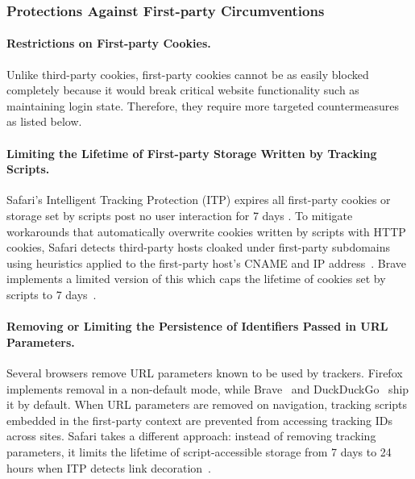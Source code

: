 \vspace{-4mm}
\subsubsection{Protections Against First-party Circumventions}

\paragraph{Restrictions on First-party Cookies.}
Unlike third-party cookies, first-party cookies cannot be as easily blocked completely because it would break critical website functionality such as maintaining login state. 
%
Therefore, they require more targeted countermeasures as listed below. 



\vspace{-1mm}
\paragraph{Limiting the Lifetime of First-party Storage Written by Tracking Scripts.}
%
Safari’s Intelligent Tracking Protection (ITP) expires all first-party cookies or storage set by scripts post no user interaction for 7 days \cite{TrackingPreventionWebKit2020}. 
%
To mitigate workarounds that automatically overwrite cookies written by scripts with HTTP cookies, Safari detects third-party hosts cloaked under first-party subdomains using heuristics applied to the first-party host’s CNAME and IP address~\cite{TrackingPreventionWebKit2020}. 
%
Brave implements a limited version of this which caps the lifetime of cookies set by scripts to 7 days~\cite{bravePrivacyProtectionSecurity}. \\



\vspace{-4mm}
\paragraph{Removing or Limiting the Persistence of Identifiers Passed in URL Parameters.}
%
Several browsers remove URL parameters known to be used by trackers. 
%
Firefox~\cite{mozillaQueryParameterStripping} implements removal in a non-default mode, while Brave~\cite{braveprivacyteamGrabBagQuery2020} and DuckDuckGo~\cite{duckduckgoDuckDuckGoWebTracking} ship it by default. 
%
When URL parameters are removed on navigation, tracking scripts embedded in the first-party context are prevented from accessing tracking IDs across sites. 
%
Safari takes a different approach: instead of removing tracking parameters, it limits the lifetime of script-accessible storage from 7 days to 24 hours when ITP detects link decoration~\cite{TrackingPreventionWebKit2020}.



